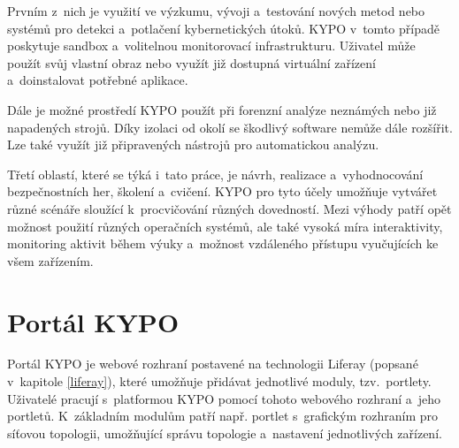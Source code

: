 \documentclass[
  digital, %
  oneside, %
  table,   %
  nolof,     %
  nolot,     %
  nocover
]{fithesis3}
\begin{document}
Prvním z~nich je využití ve výzkumu, vývoji a~testování nových metod nebo systémů pro detekci a~potlačení kybernetických útoků. KYPO v~tomto případě poskytuje sandbox a~volitelnou monitorovací infrastrukturu. Uživatel může použít svůj vlastní obraz nebo využít již dostupná virtuální zařízení a~doinstalovat potřebné aplikace. \cite{kypo2017}\par
Dále je možné prostředí KYPO použít při forenzní analýze neznámých nebo již napadených strojů. Díky izolaci od okolí se škodlivý software nemůže dále rozšířit. Lze také využít již připravených nástrojů pro automatickou analýzu. \cite{lessons2015, kypo2017}\par
Třetí oblastí, které se týká i~tato práce, je návrh, realizace a~vyhodnocování bezpečnostních her, školení a~cvičení. KYPO pro tyto účely umožňuje vytvářet různé scénáře sloužící k~procvičování různých dovedností. Mezi výhody patří opět možnost použití různých operačních systémů, ale také vysoká míra interaktivity, monitoring aktivit během výuky a~možnost vzdáleného přístupu vyučujících ke všem zařízením. \cite{lessons2015, kypocz}

\section{Portál KYPO}
Portál KYPO je webové rozhraní postavené na technologii Liferay (popsané v~kapitole \ref{liferay}), které umožňuje přidávat jednotlivé moduly, tzv.~portlety. Uživatelé pracují s~platformou KYPO pomocí tohoto webového rozhraní a~jeho portletů. K~základním modulům patří např. portlet s~grafickým rozhraním pro síťovou topologii, umožňující správu topologie a~nastavení jednotlivých zařízení.
\end{document}
